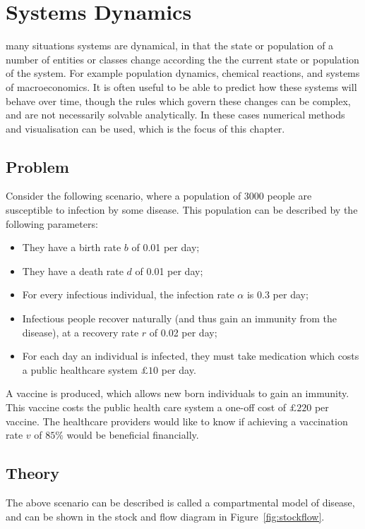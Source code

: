 \chapter[Systems dynamics]{Systems Dynamics}

 many situations systems are dynamical, in that the state
or population of a number of entities or classes change according the the
current state or population of the system. For example population dynamics,
chemical reactions, and systems of macroeconomics. It is often useful to be able
to predict how these systems will behave over time, though the rules which
govern these changes can be complex, and are not necessarily solvable
analytically. In these cases numerical methods and visualisation can be used,
which is the focus of this chapter.

\section{Problem}\label{sec:problem}
Consider the following scenario, where a population of 3000 people are
susceptible to infection by some disease. This population can be described by
the following parameters:

\begin{itemize}
  \item They have a birth rate $b$ of 0.01 per day;
  \item They have a death rate $d$ of 0.01 per day;
  \item For every infectious individual, the infection rate $\alpha$ is 0.3 per
  day;
  \item Infectious people recover naturally (and thus gain an immunity from the
  disease), at a recovery rate $r$ of 0.02 per day;
  \item For each day an individual is infected, they must take medication which
  costs a public healthcare system $\pounds 10$ per day.
\end{itemize}

A vaccine is produced, which allows new born individuals to gain an immunity.
This vaccine costs the public health care system a one-off cost of
$\pounds 220$ per vaccine. The healthcare providers would like to know if
achieving a vaccination rate $v$ of $85\%$ would be beneficial financially.

\section{Theory}\label{sec:theory}
The above scenario can be described is called a compartmental model of disease,
and can be shown in the stock and flow diagram in Figure~\ref{fig:stockflow}.

